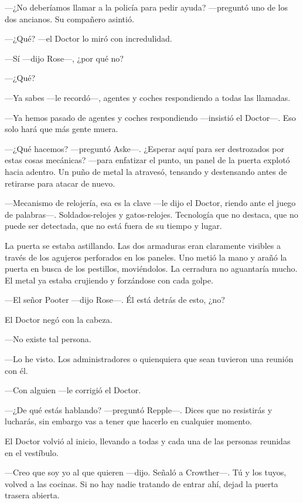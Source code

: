 {---¿No deberíamos llamar a la policía para pedir ayuda? ---preguntó uno
de los dos ancianos. Su compañero asintió. }

{---¿Qué? ---el Doctor lo miró con incredulidad.}

{---Sí ---dijo Rose---, ¿por qué no?}

{---¿Qué?}

{---Ya sabes ---le recordó---, agentes y coches respondiendo a todas las
llamadas.}

{---Ya hemos pasado de agentes y coches respondiendo ---insistió el
Doctor---. Eso solo hará que más gente muera.}

{---¿Qué hacemos? ---preguntó Aske---. ¿Esperar aquí para ser
	destrozados por estas cosas mecánicas? ---para enfatizar el punto, un
	panel de la puerta explotó hacia adentro. Un puño de metal la atravesó,
tensando y destensando antes de retirarse para atacar de nuevo.}

{---Mecanismo de relojería, esa es la clave ---le dijo el Doctor, riendo
	ante el juego de palabras---. Soldados-relojes y gatos-relojes.
	Tecnología que no destaca, que no puede ser detectada, que no está fuera
de su tiempo y lugar. }

{La puerta se estaba astillando. Las dos armaduras eran claramente
	visibles a través de los agujeros perforados en los paneles. Uno metió
	la mano y arañó la puerta en busca de los pestillos, moviéndolos. La
	cerradura no aguantaría mucho. El metal ya estaba crujiendo y forzándose
con cada golpe. }

{---El señor Pooter ---dijo Rose---. Él está detrás de esto, ¿no?}

{El Doctor negó con la cabeza. }

{---No existe tal persona.}

{---Lo he visto. Los administradores o quienquiera que sean tuvieron una
reunión con él.}

{---Con alguien ---le corrigió el Doctor. }

{---¿De qué estás hablando? ---preguntó Repple---. Dices que no
	resistirás y lucharás, sin embargo vas a tener que hacerlo en cualquier
momento.}

{El Doctor volvió al inicio, llevando a todas y cada una de las personas
reunidas en el vestíbulo. }

{---Creo que soy yo al que quieren ---dijo. Señaló a Crowther---. Tú y
	los tuyos, volved a las cocinas. Si no hay nadie tratando de entrar ahí,
dejad la puerta trasera abierta.}

